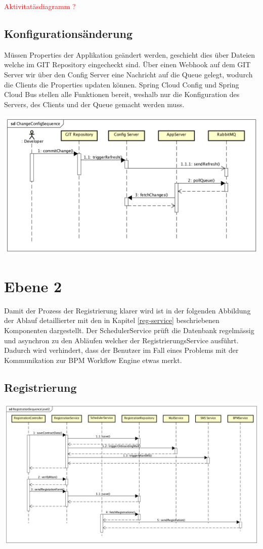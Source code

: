 \textcolor{red}{Aktivitatäsdiagramm ?}

\subsection{Konfigurationsänderung}

Müssen Properties der Applikation geändert werden, geschieht dies über Dateien  welche im GIT Repository eingecheckt sind. Über einen Webhook auf dem GIT Server wir über den Config Server eine Nachricht auf die Queue gelegt, wodurch die Clients die Properties updaten können. Spring Cloud Config und Spring Cloud Bus stellen alle Funktionen bereit, weshalb nur die Konfiguration des Servers, des Clients und der Queue gemacht werden muss.
\begin{center}
	\includegraphics[scale=0.6]{ChangeConfigSequence.png}
\end{center}
\newpage
\section{Ebene 2}

Damit der Prozess der Registrierung klarer wird ist in der folgenden Abbildung der Ablauf detaillierter mit den in Kapitel \ref{reg-service} beschriebenen Komponenten dargestellt. Der SchedulerService prüft die Datenbank regelmässig und asynchron zu den Abläufen welcher der RegistrierungsService ausführt. Dadurch wird verhindert, dass der Benutzer im Fall eines Problems mit der Kommunikation zur BPM Workflow Engine etwas merkt.
\subsection{Registrierung}
\begin{center}
	\includegraphics[scale=0.42]{RegistrationSequenceLevel2.png}
\end{center}



